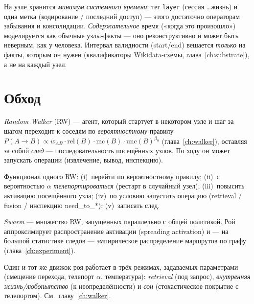 \begin{definition}
На узле хранится \emph{минимум системного времени}: тег \texttt{layer} (сессия
\dots жизнь) и одна метка (кодирование / последний доступ) — этого достаточно
операторам забывания и консолидации. \emph{Содержательное} время («когда это
произошло») моделируется как обычные узлы-факты — оно реконструктивно и может быть
неверным, как у человека. Интервал валидности (start/end) вешается \emph{только} на
факты, которым он нужен (квалификаторы Wikidata-схемы, глава~\ref{ch:substrate}), а
не на каждый узел.
\end{definition}

\section{Обход}

\begin{definition}
\emph{Random Walker} (RW) — агент, который стартует в некотором узле и шаг за шагом
переходит к соседям по \emph{вероятностному} правилу
$P(A\to B)\propto w_{AB}\cdot\text{rel}(B)\cdot\text{mc}(B)\cdot\text{unc}(B)^{\beta_u}$
(глава~\ref{ch:walker}), оставляя за собой \emph{след} — последовательность
посещённых узлов. По ходу он может запускать операции (извлечение, вывод,
инспекцию).
\end{definition}

\noindent Функционал одного RW: (i)~перейти по вероятностному правилу; (ii)~с
вероятностью $\alpha$ \emph{телепортироваться} (рестарт в случайный узел);
(iii)~повысить активацию посещённого узла; (iv)~по условию запустить операцию
(retrieval / fusion / инспекцию need\_to\_*); (v)~записать след.

\begin{definition}
\emph{Swarm} — множество RW, запущенных параллельно с общей политикой. Рой
аппроксимирует распространение активации (spreading activation) и — на большой
статистике следов — эмпирическое распределение маршрутов по графу
(глава~\ref{ch:experiment}).
\end{definition}

\begin{definition}
Один и тот же движок роя работает в трёх режимах, задаваемых параметрами
(смещение перехода, телепорт $\alpha$, температура): \emph{retrieval} (под
запрос), \emph{внутренняя жизнь/любопытство} (к неопределённости) и \emph{сон}
(стохастическое покрытие с телепортом). См.\ главу~\ref{ch:walker}.
\end{definition}

